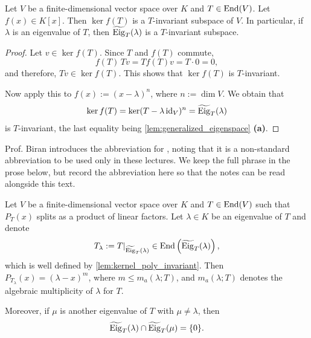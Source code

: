 \begin{lemma}
\label{lem:kernel_poly_invariant}
Let $V$ be a finite-di\-men\-sional vector space over $K$ and $T \in \operatorname{End}(V)$. Let $f(x) \in K[x]$. Then $\ker f(T)$ is a $T$-invariant subspace of $V$. In particular, if $\lambda$ is an eigenvalue of $T$, then $\widetilde{\operatorname{Eig}}_T(\lambda)$ is a $T$-invariant subspace.
\end{lemma}

\begin{proof}
Let $v \in \ker f(T)$. Since $T$ and $f(T)$ commute,
\[
    f(T)\, Tv = T f(T) v = T \cdot 0 = 0,
\]
and therefore, $Tv \in \ker f(T)$. This shows that $\ker f(T)$ is $T$-invariant.

Now apply this to $f(x) := (x - \lambda)^n$, where $n := \dim V$. We obtain that
\[
    \ker f(T) = \ker(T - \lambda \operatorname{id}_V)^n = \widetilde{\operatorname{Eig}}_T(\lambda)
\]
is $T$-invariant, the last equality being \cref{lem:generalized_eigenspace} \textbf{(a)}.
\end{proof}

\begin{notation}
\label{not:splf}
Prof. Biran introduces the abbreviation  for , noting that it is a non-standard abbreviation to be used only in these lectures. We keep the full phrase in the prose below, but record the abbreviation here so that the notes can be read alongside this text.
\end{notation}

\begin{lemma}
\label{lem:char_poly_on_generalized_eigenspace}
Let $V$ be a finite-di\-men\-sional vector space over $K$ and $T \in \operatorname{End}(V)$ such that $P_T(x)$ splits as a product of linear factors. Let $\lambda \in K$ be an eigenvalue of $T$ and denote
\[
    T_\lambda := T|_{\widetilde{\operatorname{Eig}}_T(\lambda)} \in \operatorname{End}\left(\widetilde{\operatorname{Eig}}_T(\lambda)\right),
\]
which is well defined by \cref{lem:kernel_poly_invariant}. Then $P_{T_\lambda}(x) = (\lambda - x)^m$, where $m \le m_a(\lambda; T)$, and $m_a(\lambda; T)$ denotes the algebraic multiplicity of $\lambda$ for $T$.

Moreover, if $\mu$ is another eigenvalue of $T$ with $\mu \neq \lambda$, then
\[
    \widetilde{\operatorname{Eig}}_T(\lambda) \cap \widetilde{\operatorname{Eig}}_T(\mu) = \{0\}.
\]
\end{lemma}

